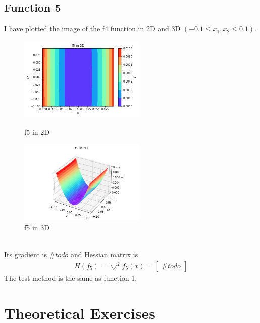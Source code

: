 \documentclass[a4paper,12pt]{article}
\begin{document}
\subsection{Function 5}
I have plotted the image of the f4 function in 2D and 3D $(-0.1 \leq x_1, x_2 \leq 0.1)$.\\
\begin{figure}[htbp]
\centering
\begin{minipage}[t]{0.48\textwidth}
\centering
\includegraphics[width=6cm]{f5_2d.jpg}
\caption{f5 in 2D}
\end{minipage}
\begin{minipage}[t]{0.48\textwidth}
\centering
\includegraphics[width=6cm]{f5_3d.jpg}
\caption{f5 in 3D}
\end{minipage}
\end{figure}\\
Its gradient is $\#todo$ and Hessian matrix is 
\begin{align*}
H(f_5) = \bigtriangledown^2 f_5(x) = 
\begin{bmatrix}
\#todo
\end{bmatrix}
\end{align*}
The test method is the same as function 1.



\section{Theoretical Exercises}
\end{document}
